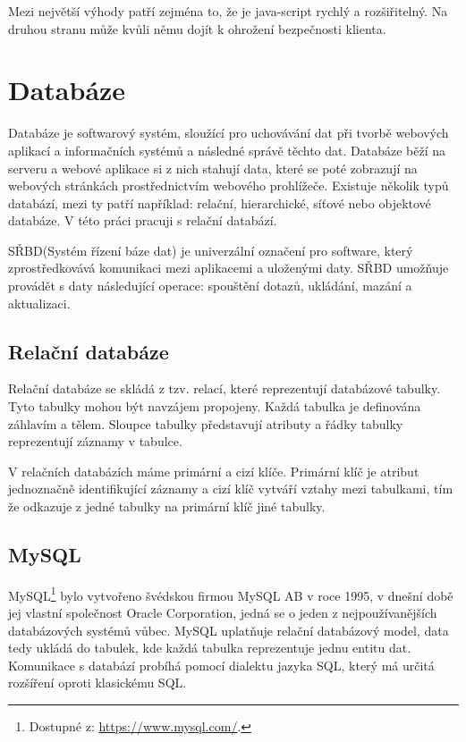 Mezi největší výhody patří zejména to, že je java-script rychlý a rozšiřitelný. Na druhou stranu může kvůli němu dojít k ohrožení bezpečnosti klienta. \cite{javascript2}

\section{Databáze}

Databáze je softwarový systém, sloužící
pro uchovávání dat při tvorbě webových aplikací a informačních systémů a následné správě těchto dat. Databáze běží na serveru a webové aplikace si z nich stahují data, které se poté zobrazují na webových stránkách prostřednictvím  webového prohlížeče. Existuje několik typů databází, mezi ty patří například: relační, hierarchické, síťové nebo objektové databáze. \cite{db1} V této práci pracuji s relační databází.


 SŘBD(Systém řízení báze dat) je univerzální označení pro software, který zprostředkovává komunikaci mezi aplikacemi a uloženými daty. SŘBD umožňuje provádět s daty následující operace: spouštění dotazů, ukládání, mazání a aktualizaci. \cite{db2} 

\subsection{Relační databáze}

Relační databáze se skládá z tzv. relací, které reprezentují databázové tabulky. Tyto tabulky mohou být navzájem propojeny. Každá tabulka je definována záhlavím a tělem. Sloupce tabulky představují atributy a řádky tabulky reprezentují záznamy v tabulce. \cite{relacnidb}

V relačních databázích máme primární a cizí klíče. Primární klíč je atribut jednoznačně identifikující záznamy a cizí klíč vytváří vztahy mezi tabulkami, tím že odkazuje z jedné tabulky na primární klíč jiné tabulky. \cite{relacnidb}


\subsection{MySQL}

MySQL\footnote{Dostupné z: \url{https://www.mysql.com/}.} bylo vytvořeno švédskou firmou MySQL AB v roce 1995, v dnešní době  jej vlastní společnost Oracle Corporation, jedná se o jeden z nejpoužívanějších databázových systémů vůbec. MySQL uplatňuje relační databázový model, data tedy ukládá do tabulek, kde každá tabulka reprezentuje jednu entitu dat. Komunikace s databází probíhá pomocí dialektu jazyka SQL, který má určitá rozšíření oproti klasickému SQL. \cite{mysql1} 

